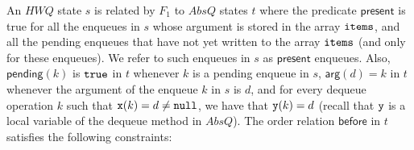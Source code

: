 An $\mathit{HWQ}$ state $s$ is related by $F_1$ to $AbsQ$ states $t$ where the predicate 
$\mathsf{present}$ is true for all the enqueues in $s$ whose argument is stored in the array ${\tt items}$, and all the pending enqueues that have not yet written to the array ${\tt items}$ (and only for these enqueues). We refer to such enqueues in $s$ as $\mathsf{present}$ enqueues. Also, $\mathsf{pending}(k)$ is ${\tt true}$ in $t$ whenever $k$ is a pending enqueue in $s$, $\mathsf{arg}(d)=k$ in $t$ whenever the argument of the enqueue $k$ in $s$ is $d$, and for every dequeue operation $k$ such that ${\tt x}(k)=d\neq {\tt null}$, we have that ${\tt y}(k)=d$ (recall that ${\tt y}$ is a local variable of the dequeue method in $AbsQ$). The order relation $\mathsf{before}$ in $t$ satisfies the following constraints:
\vspace{-2mm}
